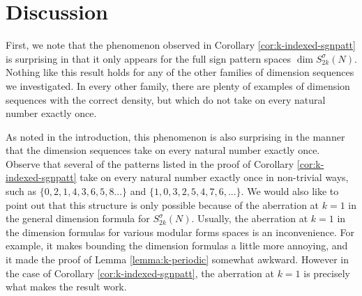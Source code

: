 \documentclass[12pt,letterpaper,reqno]{amsart}
\theoremstyle{definition}
\numberwithin{equation}{section}
\numberwithin{figure}{section}
\numberwithin{table}{section}
\begin{document}
\section{Discussion}

First, we note that the phenomenon observed in Corollary \ref{cor:k-indexed-sgnpatt} is surprising in that it only appears for the full sign pattern spaces $\dim S_{2k}^\sigma(N)$. Nothing like this result holds for any of the other families of dimension sequences we investigated. In every other family, there are plenty of examples of dimension sequences with the correct density, but which do not take on every natural number exactly once. 

As noted in the introduction, this phenomenon is also surprising in the manner that the dimension sequences take on every natural number exactly once. Observe that several of the patterns listed in the proof of Corollary \ref{cor:k-indexed-sgnpatt} take on every natural number exactly once in non-trivial ways, such as
$\{0,2,1,4,3,6,5,8...\}$ and  $\{1,0,3,2,5,4,7,6,...\}$. We would also like to point out that this structure is only possible because of the aberration at $k=1$ in the general dimension formula for $S_{2k}^\sigma(N)$. Usually, the aberration at $k=1$ in the dimension formulas for various modular forms spaces is an inconvenience. For example, it makes bounding the dimension formulas a little more annoying, and it made the proof of Lemma \ref{lemma:k-periodic} somewhat awkward. However in the case of Corollary \ref{cor:k-indexed-sgnpatt}, the aberration at $k=1$ is precisely what makes the result work.
\end{document}
